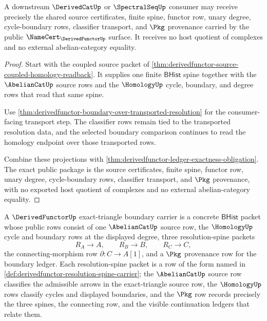 \begin{theorem}\label{thm:derivedfunctor-downstream-consumer-package}
A downstream $\DerivedCatUp$ or $\SpectralSeqUp$ consumer may receive precisely the shared source certificates, finite spine, functor row, unary degree, cycle-boundary rows, classifier transport, and $\Pkg$ provenance carried by the public $\NameCert_{\DerivedFunctorUp}$ surface. It receives no host quotient of complexes and no external abelian-category equality.
\end{theorem}
\begin{proof}
Start with the coupled source packet of \autoref{thm:derivedfunctor-source-coupled-homology-readback}. It supplies one finite $\mathsf{BHist}$ spine together with the $\AbelianCatUp$ source rows and the $\HomologyUp$ cycle, boundary, and degree rows that read that same spine.

Use \autoref{thm:derivedfunctor-boundary-over-transported-resolution} for the consumer-facing transport step. The classifier rows remain tied to the transported resolution data, and the selected boundary comparison continues to read the homology endpoint over those transported rows.

Combine these projections with \autoref{thm:derivedfunctor-ledger-exactness-obligation}. The exact public package is the source certificates, finite spine, functor row, unary degree, cycle-boundary rows, classifier transport, and $\Pkg$ provenance, with no exported host quotient of complexes and no external abelian-category equality.
\end{proof}

\begin{definition}\label{def:derivedfunctor-exact-triangle-boundary-carrier}
A $\DerivedFunctorUp$ exact-triangle boundary carrier is a concrete $\mathsf{BHist}$ packet whose public rows consist of one $\AbelianCatUp$ source row, the $\HomologyUp$ cycle and boundary rows at the displayed degree, three resolution-spine packets
$$
R_A\to A,\qquad R_B\to B,\qquad R_C\to C,
$$
the connecting-morphism row $\partial:C\to A[1]$, and a $\Pkg$ provenance row for the boundary ledger. Each resolution-spine packet is a row of the form named in \autoref{def:derivedfunctor-resolution-spine-carrier}; the $\AbelianCatUp$ source row classifies the admissible arrows in the exact-triangle source row, the $\HomologyUp$ rows classify cycles and displayed boundaries, and the $\Pkg$ row records precisely the three spines, the connecting row, and the visible continuation ledgers that relate them.
\end{definition}


